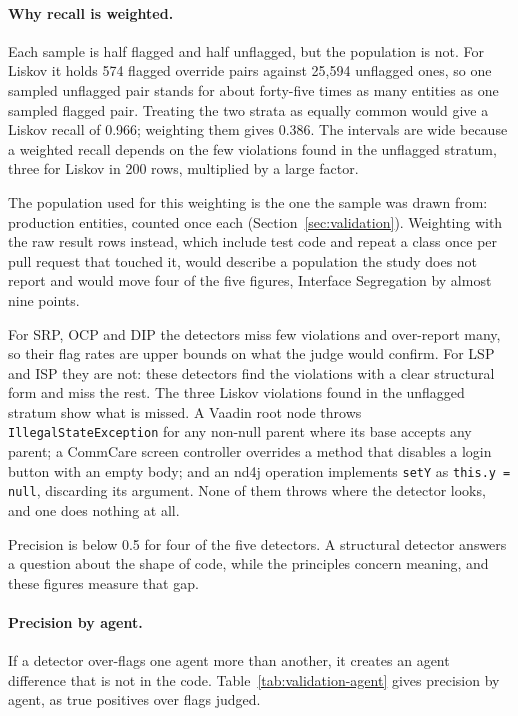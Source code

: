 \paragraph{Why recall is weighted.} Each sample is half flagged and half unflagged, but the
population is not. For Liskov it holds 574 flagged override pairs against 25{,}594 unflagged ones,
so one sampled unflagged pair stands for about forty-five times as many entities as one sampled
flagged pair. Treating the two strata as equally common would give a Liskov recall of 0.966;
weighting them gives 0.386. The intervals are wide because a weighted recall depends on the few
violations found in the unflagged stratum, three for Liskov in 200 rows, multiplied by a large
factor.

The population used for this weighting is the one the sample was drawn from: production entities,
counted once each (Section~\ref{sec:validation}). Weighting with the raw result rows instead, which
include test code and repeat a class once per pull request that touched it, would describe a
population the study does not report and would move four of the five figures, Interface Segregation
by almost nine points.

For SRP, OCP and DIP the detectors miss few violations and over-report many, so their flag rates are
upper bounds on what the judge would confirm. For LSP and ISP they are not: these detectors find the
violations with a clear structural form and miss the rest. The three Liskov violations found in the
unflagged stratum show what is missed. A Vaadin root node throws \texttt{IllegalStateException} for
any non-null parent where its base accepts any parent; a CommCare screen controller overrides a
method that disables a login button with an empty body; and an nd4j operation implements
\texttt{setY} as \texttt{this.y = null}, discarding its argument. None of them throws where the
detector looks, and one does nothing at all.

Precision is below 0.5 for four of the five detectors. A structural detector answers a question about
the shape of code, while the principles concern meaning, and these figures measure that gap.

\paragraph{Precision by agent.} If a detector over-flags one agent more than another, it creates an
agent difference that is not in the code. Table~\ref{tab:validation-agent} gives precision by agent, as true positives over flags judged.

